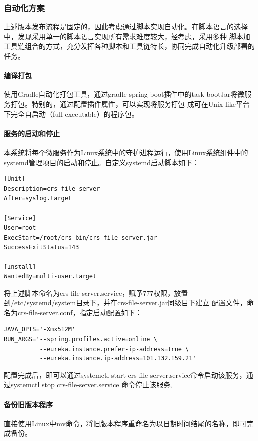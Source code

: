 \documentclass[titlepage,UTF8,linespread=1.5]{ctexart}
\begin{document}
\subsubsection{自动化方案}
上述版本发布流程是固定的，因此考虑通过脚本实现自动化。在脚本语言的选择中，发现采用单一的脚本语言实现所有需求难度较大，经考虑，采用多种
脚本加工具链组合的方式，充分发挥各种脚本和工具链特长，协同完成自动化升级部署的任务。\par
\paragraph{编译打包}
使用Gradle自动化打包工具，通过gradle spring-boot插件中的task bootJar将微服务打包。特别的，通过配置插件属性，可以实现将服务打包
成可在Unix-like平台下完全自启动（full executable）的程序包。\par
\paragraph{服务的启动和停止}
本系统将每个微服务作为Linux系统中的守护进程运行，使用Linux系统组件中的systemd管理项目的启动和停止。自定义systemd启动脚本如下：
\begin{mdframed}\begin{verbatim}
[Unit]
Description=crs-file-server
After=syslog.target

[Service]
User=root
ExecStart=/root/crs-bin/crs-file-server.jar
SuccessExitStatus=143

[Install]
WantedBy=multi-user.target
\end{verbatim}\end{mdframed}\par
将上述脚本命名为crs-file-server.service，赋予777权限，放置到/etc/systemd/system目录下，并在crs-file-server.jar同级目下建立
配置文件，命名为crs-file-server.conf，指定启动配置如下：
\begin{mdframed}\begin{verbatim}
JAVA_OPTS='-Xmx512M'
RUN_ARGS='--spring.profiles.active=online \
          --eureka.instance.prefer-ip-address=true \
          --eureka.instance.ip-address=101.132.159.21'
\end{verbatim}\end{mdframed}\par
配置完成后，即可以通过systemctl start crs-file-server.service命令启动该服务，通过systemctl stop crs-file-server.service
命令停止该服务。\par
\paragraph{备份旧版本程序}
直接使用Linux中mv命令，将旧版本程序重命名为以日期时间结尾的名称，即可完成备份。
\end{document}
